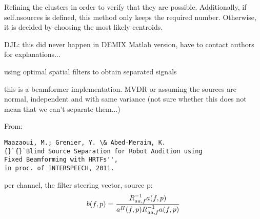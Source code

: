 \documentclass[letterpaper,10pt,english]{sphinxmanual}
\begin{document}
\begin{fulllineitems}

\begin{fulllineitems}
\label{reference/demix:pyfasst.demixTF.DEMIX.refine_clusters}
Refining the clusters in order to verify that they are possible.
Additionally, if self.nsources is defined, this method only keeps
the required number. Otherwise, it is decided by choosing the most
likely centroids.

\end{fulllineitems}


\begin{fulllineitems}
\label{reference/demix:pyfasst.demixTF.DEMIX.remove_empty_clusters}
DJL: this did never happen in DEMIX Matlab version, have to contact
authors for explanations...

\end{fulllineitems}


\begin{fulllineitems}
\label{reference/demix:pyfasst.demixTF.DEMIX.spatial_filtering}
using optimal spatial filters to obtain separated signals

this is a beamformer implementation.
MVDR or assuming the sources are normal, independent and
with same variance (not sure whether this does not mean that
we can't separate them...)

From:

\begin{Verbatim}[commandchars=\\\{\}]
Maazaoui, M.; Grenier, Y. \& Abed-Meraim, K.
{}`{}`Blind Source Separation for Robot Audition using
Fixed Beamforming with HRTFs'', 
in proc. of INTERSPEECH, 2011.
\end{Verbatim}

per channel, the filter steering vector, source p:
\begin{gather}
\begin{split}b(f,p) = \frac{R_{aa,f}^{-1} a(f,p)}{a^{H}(f,p) R_{aa,f}^{-1} a(f,p)}\end{split}\notag
\end{gather}
\end{fulllineitems}


\end{fulllineitems}
\end{document}
